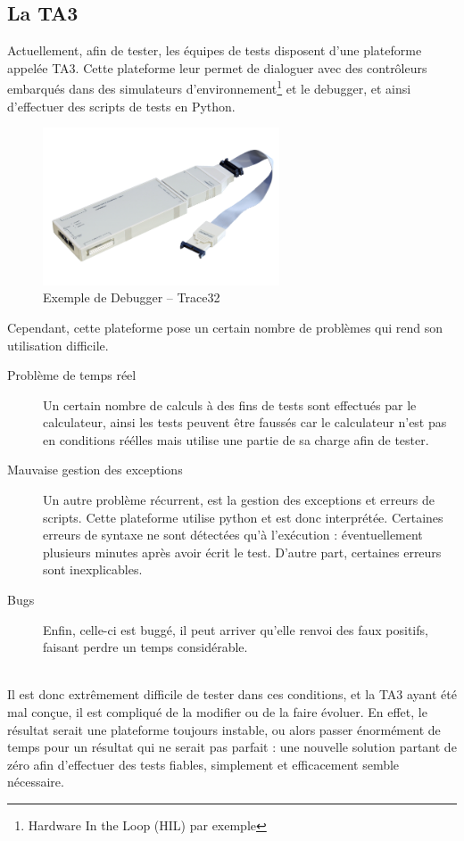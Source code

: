 	\subsection{La TA3}
	Actuellement, afin de tester, les équipes de tests disposent d'une plateforme appelée TA3. Cette plateforme leur permet de dialoguer avec des contrôleurs embarqués dans des simulateurs d'environnement\footnote{Hardware In the Loop (HIL) par exemple} et le debugger, et ainsi d'effectuer des scripts de tests en Python.
	\begin{figure}[H]		
		\centering
		\includegraphics[width=7cm]{contents/images/trace32.png}
		\caption{Exemple de Debugger -- Trace32}
		\label{fig:photoHil}
	\end{figure}

	Cependant, cette plateforme pose un certain nombre de problèmes qui rend son utilisation difficile.
	\begin{description}
		\item[Problème de temps réel] Un certain nombre de calculs à des fins de tests sont effectués par le calculateur, ainsi les tests peuvent être faussés car le calculateur n'est pas en conditions réélles mais utilise une partie de sa charge afin de tester.
		\item[Mauvaise gestion des exceptions] Un autre problème récurrent, est la gestion des exceptions et erreurs de scripts. Cette plateforme utilise python et est donc interprétée. Certaines erreurs de syntaxe ne sont détectées qu'à l'exécution : éventuellement plusieurs minutes après avoir écrit le test. D'autre part, certaines erreurs sont inexplicables.
		\item[Bugs] Enfin, celle-ci est buggé, il peut arriver qu'elle renvoi des faux positifs, faisant perdre un temps considérable.
	\end{description}
~\\
	Il est donc extrêmement difficile de tester dans ces conditions, et la TA3 ayant été mal conçue, il est compliqué de la modifier ou de la faire évoluer. En effet, le résultat serait une plateforme toujours instable, ou alors passer énormément de temps pour un résultat qui ne serait pas parfait : une nouvelle solution partant de zéro afin d'effectuer des tests fiables, simplement et efficacement semble nécessaire.


